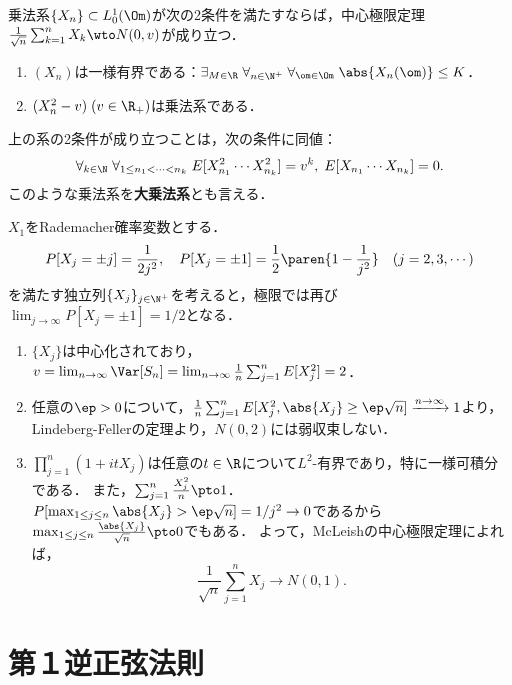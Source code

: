 \documentclass[uplatex,dvipdfmx]{jsreport}
\begin{document}
\begin{corollary}[大乗法系に関する中心極限定理]
    乗法系$\{X_n\}\subset L^1_0(\Om)$が次の2条件を満たすならば，中心極限定理$\frac{1}{\sqrt{n}}\sum_{k=1}^nX_k\wto N(0,v)$が成り立つ．
    \begin{enumerate}
        \item $(X_n)$は一様有界である：$\exists_{M\in\R}\;\forall_{n\in\N^+}\;\forall_{\om\in\Om}\;\abs{X_n(\om)}\le K$．
        \item $(X_n^2-v)\;(v\in\R_+)$は乗法系である．
    \end{enumerate}
\end{corollary}

\begin{lemma}
    上の系の2条件が成り立つことは，次の条件に同値：
    \[\forall_{k\in\N}\;\forall_{1\le n_1<\cdots<n_k}\;E[X_{n_1}^2\cdots X^2_{n_k}]=v^k,\;E[X_{n_1}\cdots X_{n_k}]=0.\]
    このような乗法系を\textbf{大乗法系}とも言える．
\end{lemma}

\begin{example}
    $X_1$をRademacher確率変数とする．
    \[P[X_j=\pm j]=\frac{1}{2j^2},\quad P[X_j=\pm1]=\frac{1}{2}\paren{1-\frac{1}{j^2}}\quad(j=2,3,\cdots)\]
    を満たす独立列$\{X_j\}_{j\in\N^+}$を考えると，極限では再び$\lim_{j\to\infty}P[X_j=\pm1]=1/2$となる．
    \begin{enumerate}
        \item $\{X_j\}$は中心化されており，$v=\lim_{n\to\infty}\Var[S_n]=\lim_{n\to\infty}\frac{1}{n}\sum_{j=1}^nE[X_j^2]=2$．
        \item 任意の$\ep>0$について，$\frac{1}{n}\sum_{j=1}^nE[X_j^2,\abs{X_j}\ge\ep\sqrt{n}]\xrightarrow{n\to\infty}1$より，Lindeberg-Fellerの定理より，$N(0,2)$には弱収束しない．
        \item $\prod_{j=1}^n(1+itX_j)$は任意の$t\in\R$について$L^2$-有界であり，特に一様可積分である．
        また，$\sum_{j=1}^n\frac{X_j^2}{n}\pto 1$．$P[\max_{1\le j\le n}\abs{X_j}>\ep\sqrt{n}]=1/j^2\to0$であるから$\max_{1\le j\le n}\frac{\abs{X_j}}{\sqrt{n}}\pto0$でもある．
        よって，McLeishの中心極限定理によれば，
        \[\frac{1}{\sqrt{n}}\sum_{j=1}^nX_j\to N(0,1).\]
    \end{enumerate}
\end{example}

\section{第１逆正弦法則}
\end{document}
